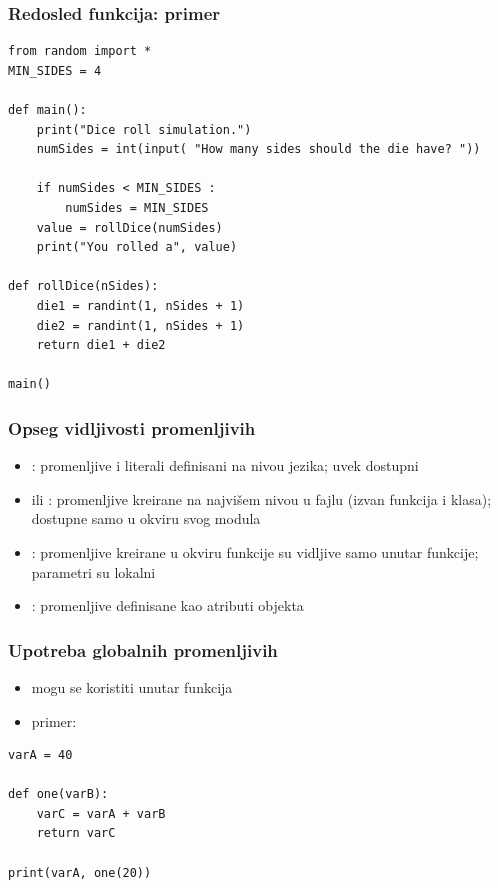 \documentclass[compress]{beamer}
\begin{document}
\begin{frame}[fragile]
\frametitle{Redosled funkcija: primer}
\begin{verbatim}
from random import *
MIN_SIDES = 4

def main():
    print("Dice roll simulation.")
    numSides = int(input( "How many sides should the die have? "))
       
    if numSides < MIN_SIDES :
        numSides = MIN_SIDES
    value = rollDice(numSides)
    print("You rolled a", value)
   
def rollDice(nSides):
    die1 = randint(1, nSides + 1)
    die2 = randint(1, nSides + 1)
    return die1 + die2
   
main()
\end{verbatim}
\end{frame}

\begin{frame}[fragile]
\frametitle{Opseg vidljivosti promenljivih}
\begin{itemize}
  \item {}: promenljive i literali definisani na nivou jezika; uvek dostupni
  \item {} ili : promenljive kreirane na najvišem nivou u fajlu (izvan funkcija i klasa); dostupne samo u okviru svog modula
  \item {}: promenljive kreirane u okviru funkcije su vidljive samo unutar funkcije; parametri su lokalni
  \item {}: promenljive definisane kao atributi objekta
\end{itemize}
\end{frame}

\begin{frame}[fragile]
\frametitle{Upotreba globalnih promenljivih}
\begin{itemize}
  \item mogu se koristiti unutar funkcija
  \item primer:
\end{itemize}
\begin{verbatim}
varA = 40

def one(varB):
    varC = varA + varB
    return varC

print(varA, one(20))
\end{verbatim}
\end{frame}
\end{document}
